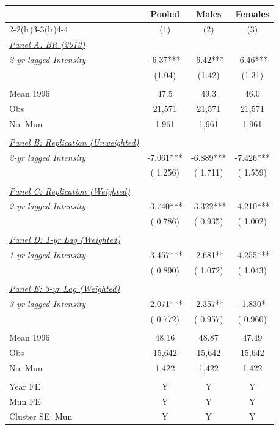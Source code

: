 \begin{tabular}{lccc} \hline \hline
& \multicolumn{1}{c}{Pooled} & \multicolumn{1}{c}{Males} & \multicolumn{1}{c}{Females} \\ 
\cmidrule(lr){2-2}\cmidrule(lr){3-3}\cmidrule(lr){4-4}  
& \multicolumn{1}{c}{(1)} & \multicolumn{1}{c}{(2)} & \multicolumn{1}{c}{(3)} \\ \toprule 
\underline{\textit{Panel A: BR (2013)}}  \\ 
\textit{2-yr lagged Intensity} & -6.37*** & -6.42*** & -6.46*** \\ 
 & (1.04) & (1.42) & (1.31) \\ 
  & & & \\ 
Mean 1996 & 47.5 & 49.3 & 46.0 \\ 
Obs & 21,571 & 21,571 & 21,571 \\ 
No. Mun & 1,961 & 1,961 & 1,961 \\ 
  & & & \\ 
\underline{\textit{Panel B: Replication (Unweighted)}}  \\ 
\textit{2-yr lagged Intensity} &       -7.061*** &       -6.889*** &       -7.426*** \\ 
 & (       1.256) & (       1.711) & (       1.559) \\ 
  & & & \\ 
\underline{\textit{Panel C: Replication (Weighted)}}  \\ 
\textit{2-yr lagged Intensity} &       -3.740*** &       -3.322*** &       -4.210*** \\ 
 & (       0.786) & (       0.935) & (       1.002) \\ 
  & & & \\ 
\underline{\textit{Panel D: 1-yr Lag (Weighted)}}  \\ 
\textit{1-yr lagged Intensity} &       -3.457*** &       -2.681** &       -4.255*** \\ 
 & (       0.890) & (       1.072) & (       1.043) \\ 
  & & & \\ 
\underline{\textit{Panel E: 3-yr Lag (Weighted)}}  \\ 
\textit{3-yr lagged Intensity} &       -2.071*** &       -2.357** &       -1.830* \\ 
 & (       0.772) & (       0.957) & (       0.960) \\ 
  & & & \\ 
Mean 1996 &        48.16 &        48.87 &        47.49 \\ 
Obs &       15,642 &       15,642 &       15,642 \\ 
No. Mun &        1,422 &        1,422 &        1,422 \\ 
  & & & \\ 
Year FE & Y & Y & Y \\ 
Mun FE & Y & Y & Y \\ 
Cluster SE: Mun & Y & Y & Y \\ 
\bottomrule
\end{tabular}
